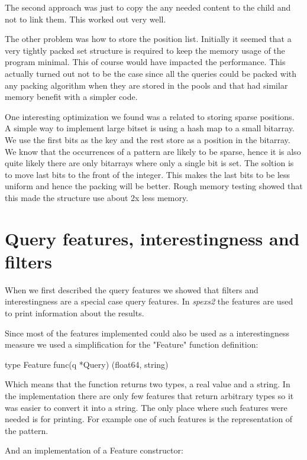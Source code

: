 The second approach was just to copy the any needed content to the child and not to link them. This worked out very well.

The other problem was how to store the position list. Initially it seemed that a very tightly packed set structure is required to keep the memory usage of the program minimal. This of course would have impacted the performance. This actually turned out not to be the case since all the queries could be packed with any packing algorithm when they are stored in the pools and that had similar memory benefit with a simpler code.

One interesting optimization we found was a related to storing sparse positions. A simple way to implement large bitset is using a hash map to a small bitarray. We use the first bits as the key and the rest store as a position in the bitarray. We know that the occurrences of a pattern are likely to be sparse, hence it is also quite likely there are only bitarrays where only a single bit is set. The soltion is to move last bits to the front of the integer. This makes the last bits to be less uniform and hence the packing will be better. Rough memory testing showed that this made the structure use about 2x less memory.

\section{Query features, interestingness and filters}

When we first described the query features we showed that filters and interestingness are a special case query features. In \emph{spexs2} the features are used to print information about the results.

Since most of the features implemented could also be used as a interestingness measure we used a simplification for the "Feature" function definition:

\begin{file}
type Feature func(q *Query) (float64, string)
\end{file}

Which means that the function returns two types, a real value and a string. In the implementation there are only few features that return arbitrary types so it was easier to convert it into a string. The only place where such features were needed is for printing. For example one of such features is the representation of the pattern.

And an implementation of a Feature constructor:

